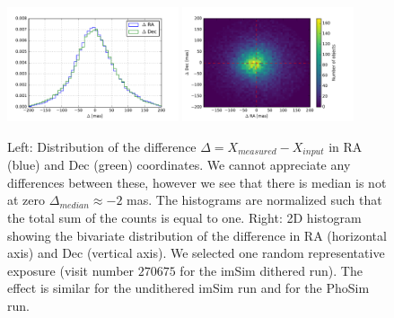 \documentclass[\docopts]{\docclass}
\begin{document}
\begin{figure}
  \centering
  \includegraphics[width=0.45\textwidth]{astrometry_single_visit_imsim_dithered_hist}
  \includegraphics[width=0.45\textwidth]{astrometry_single_visit_imsim_dithered_hist2d}
  \caption{Left: Distribution of the difference $\Delta=X_{measured}-X_{input}$ in RA (blue) and Dec (green) coordinates. We cannot
  appreciate any differences between these, however we see that there is median is not at zero $\Delta_{median} \approx -2$ mas.
  The histograms are normalized such that the total sum of the counts is equal to one. Right: 2D histogram
  showing the bivariate distribution of the difference in RA (horizontal axis) and Dec (vertical axis). We selected one random representative
  exposure (visit number $270675$ for the imSim dithered run). The effect is similar for the undithered imSim run and for the PhoSim run.}
  \label{fig:astrometry_a}
\end{figure}
\end{document}
